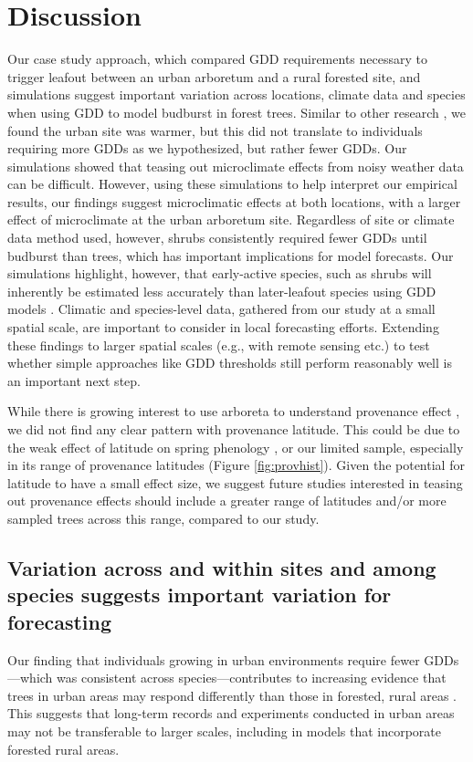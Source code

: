 \documentclass{article}\usepackage[]{graphicx}\usepackage[]{color}
\newcommand{\R}[1]{\label{#1}\linelabel{#1}}
\begin{document}
\section{Discussion} 
Our case study approach, which compared GDD requirements necessary to trigger leafout between an urban arboretum and a rural forested site, and simulations suggest important variation across locations, climate data and species when using GDD to model budburst in forest trees. Similar to other research \citep{Meng2020}, we found the urban site was warmer, but this did not translate to individuals requiring more GDDs as we hypothesized, but rather fewer GDDs. Our simulations showed that teasing out microclimate effects from noisy weather data can be difficult. However, using these simulations to help interpret our empirical results, our findings suggest microclimatic effects at both locations, with a larger effect of microclimate at the urban arboretum site. Regardless of site or climate data method used, however, shrubs consistently required fewer GDDs until budburst than trees, which has important implications for model forecasts. Our simulations highlight, however, that early-active species, such as shrubs will inherently be estimated less accurately than later-leafout species using GDD models \citep{Basler2016}. \R{Z1largespatialscale}Climatic and species-level data, gathered from our study at a small spatial scale, are important to consider in local forecasting efforts. Extending these findings to larger spatial scales (e.g., with remote sensing etc.) to test whether simple approaches like GDD thresholds still perform reasonably well is an important next step.\R{Z1scaleend}

While there is growing interest to use arboreta to understand provenance effect \citep{Primack2009}, we did not find any clear pattern with provenance latitude. This could be due to the weak effect of latitude on spring phenology \citep{Gauzere2017}, or our limited sample, especially in its range of provenance latitudes (Figure \ref{fig:provhist}). Given the potential for latitude to have a small effect size, we suggest future studies interested in teasing out provenance effects should include a greater range of latitudes and/or more sampled trees across this range, compared to our study. 

\subsection{Variation across and within sites and among species suggests important variation for forecasting} 
Our finding that individuals growing in urban environments require fewer GDDs---which was consistent across species---contributes to increasing evidence that trees in urban areas may respond differently than those in forested, rural areas \citep{Meng2020}. This suggests that long-term records and experiments conducted in urban areas may not be transferable to larger scales, including in models that incorporate forested rural areas. 
\end{document}
